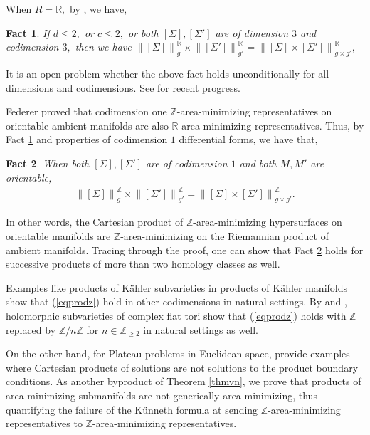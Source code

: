 \documentclass[11pt,a4paper]{amsart}
\numberwithin{equation}{section}
\newcommand{\Si}{\Sigma}
\newcommand{\no}[1]{\left\lVert#1\right\rVert}
\newcommand{\R}{\mathbb{R}}
\newcommand{\Z}{\mathbb{Z}}
\theoremstyle{plain}
\newtheorem{fact}{Fact}[subsection]
\theoremstyle{definition}
\numberwithin{equation}{subsection}
\begin{document}
	When $R=\R,$ by \cite[Theorem 5.2]{FMea}, we have,
	\begin{fact}\label{fctfm}
		If $d\le 2,$ or $c\le 2,$ or both $[\Si],[\Si']$ are of dimension $3$ and codimension $3,$ then we have
		$\no{[\Si]}^{\R}_{g}\times \no{[\Si']}^{\R}_{g'}=
		\no{[\Si]\times [\Si']}^{\R}_{g\times g'},
		$\end{fact}
	It is an open problem whether the above fact holds unconditionally for all dimensions and codimensions. See \cite{RZcf} for recent progress.
	
	Federer \cite{HFrf} proved that codimension one $\Z$-area-minimizing representatives on orientable ambient manifolds are also $\R$-area-minimizing representatives. Thus, by Fact \ref{fctfm} and properties of codimension $1$ differential forms, we have that,
	\begin{fact}\label{fctfedco}
		When both $[\Si],[\Si']$ are of codimension $1$ and both $M,M'$ are orientable,
		\begin{align}\label{eqprodz}
			\no{[\Si]}^{\Z}_{g}\times \no{[\Si']}^{\Z}_{g'}=		\no{[\Si]\times [\Si']}^{\Z}_{g\times g'}.
		\end{align}
	\end{fact}  
	In other words, the Cartesian product of $\Z$-area-minimizing hypersurfaces on orientable manifolds are $\Z$-area-minimizing on the Riemannian product of ambient manifolds. Tracing through the proof, one can show that Fact \ref{fctfedco} holds for successive products of more than two homology classes as well.
	
	Examples like products of K\"{a}hler subvarieties in products of K\"{a}hler manifolds \cite{HL} show that (\ref{eqprodz}) hold in other codimensions in natural settings. By \cite{FMcalv} and \cite[Lemma 2.11]{ZLa}, holomorphic subvarieties of complex flat tori show that (\ref{eqprodz}) holds with $\Z$ replaced by $\Z/n\Z$ for $n\in\Z_{\ge 2}$ in natural settings as well. 
	
	On the other hand, for Plateau problems in Euclidean space, \cite{FMmc,BWmc} provide examples where Cartesian products of solutions are not solutions to the product boundary conditions. As another byproduct of Theorem \ref{thmvn}, we prove that products of area-minimizing submanifolds are not generically area-minimizing, thus quantifying the failure of the K\"{u}nneth formula at sending $\Z$-area-minimizing representatives to $\Z$-area-minimizing representatives. 
	
\end{document}
